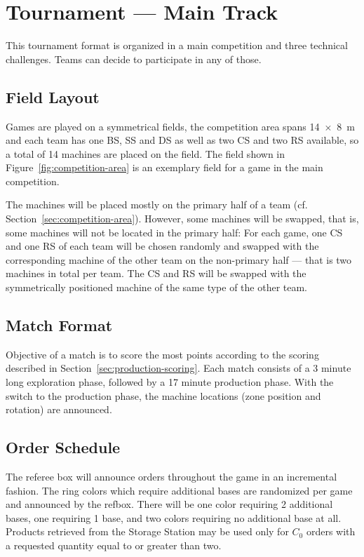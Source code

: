 \documentclass[12pt,twoside]{article}
\newcommand{\refsec}[1]{Section~\ref{#1}}
\newcommand{\reffig}[1]{Figure~\ref{#1}}
\begin{document}


\section{Tournament --- Main Track}
\label{sec:tournament-main}
This tournament format is organized in a main competition and three technical
challenges. Teams can decide to participate in any of those.

\subsection{Field Layout}
Games are played on a symmetrical fields, the competition area spans
\SI{14 x 8}{\metre} and each team has one BS, SS and DS as well as %
two CS and two RS available, so a total of 14 machines are placed on the field.
The field shown in \reffig{fig:competition-area} is an exemplary field for
a game in the main competition.

The machines will be placed mostly on the primary half
of a team (cf. \refsec{sec:competition-area}). However, some machines will be
swapped, that is, some machines will not be located in the primary
half:
For each game, one CS and one RS of each team will be chosen randomly
and swapped with the corresponding machine of the other team on the
non-primary half --- that is two machines in total per team. The CS and
RS will be swapped with the symmetrically positioned machine of the
same type of the other team.

\subsection{Match Format}
Objective of a match is to score the most points according to the scoring
described in \refsec{sec:production-scoring}.
Each match consists of a 3 minute long exploration phase, followed by
a 17 minute production phase.
With the switch to the production phase, the machine locations (zone position
and rotation) are announced.

\subsection{Order Schedule}
The referee box will announce orders throughout the game in an
incremental fashion.
The ring colors which
require additional bases are randomized per game and announced by the
refbox. There will be one color requiring 2 additional bases, one
requiring 1 base, and two colors requiring no additional base at
all. Products retrieved from the Storage Station may be used only for
$C_0$ orders with a requested quantity equal to or greater than two.
\end{document}
